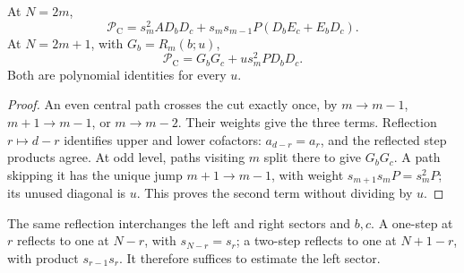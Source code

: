\begin{lemma}\label{lc:central-factors}
At \(N=2m\),
\begin{equation}\label{lc:even-factor}
 \mathcal P_{\mathrm C}
 =s_m^2A D_bD_c+s_ms_{m-1}P(D_bE_c+E_bD_c).
\end{equation}\aliascurrentequation{\label{sa:even}}
At \(N=2m+1\), with \(G_b=R_m(b;u)\),
\begin{equation}\label{lc:odd-factor}
 \mathcal P_{\mathrm C}=G_bG_c+u s_m^2P D_bD_c.
\end{equation}\aliascurrentequation{\label{sa:odd}}
Both are polynomial identities for every \(u\).
\end{lemma}
\begin{proof}
An even central path crosses the cut exactly once, by \(m\to m-1\),
\(m+1\to m-1\), or \(m\to m-2\). Their weights give the three
terms. Reflection \(r\mapsto d-r\) identifies upper and lower
cofactors: \(a_{d-r}=a_r\), and the reflected step products agree.
At odd level, paths visiting \(m\) split there to give \(G_bG_c\).
A path skipping it has the unique jump \(m+1\to m-1\), with weight
\(s_{m+1}s_mP=s_m^2P\); its unused diagonal is \(u\).
This proves the second term without dividing by \(u\).
\end{proof}

The same reflection interchanges the left and right sectors and \(b,c\).
A one-step at \(r\) reflects to one at \(N-r\), with \(s_{N-r}=s_r\);
a two-step reflects to one at \(N+1-r\), with product \(s_{r-1}s_r\).
It therefore suffices to estimate the left sector.


